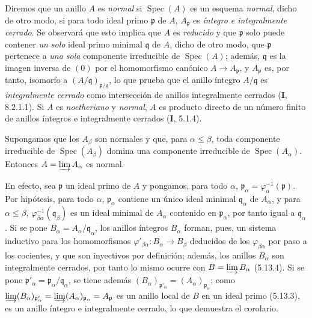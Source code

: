 \begin{env}[5.13.5]
\label{IV.2.s5.13.5-fr}
Diremos que un anillo $A$ es \emph{normal} si
$\operatorname{Spec}(A)$ es un esquema \emph{normal}, dicho de otro modo, si para
todo ideal primo $\mathfrak p$ de $A$, $A_{\mathfrak p}$ es \emph{íntegro e
integralmente cerrado}. Se observará que esto implica que $A$ es \emph{reducido} y que
$\mathfrak p$ solo puede contener \emph{un solo} ideal primo minimal $\mathfrak q$
de $A$, dicho de otro modo, que $\mathfrak p$ pertenece a \emph{una sola} componente
irreducible de $\operatorname{Spec}(A)$; además, $\mathfrak q$ es la imagen
inversa de $(0)$ por el homomorfismo canónico $A\to A_{\mathfrak p}$, y
$A_{\mathfrak p}$ es, por tanto, isomorfo a
$(A/\mathfrak q)_{\mathfrak p/\mathfrak q}$, lo que prueba que el anillo
íntegro $A/\mathfrak q$ es \emph{integralmente cerrado} como intersección de anillos
integralmente cerrados (\textbf I, 8.2.1.1). Si $A$ es \emph{noetheriano} y \emph{normal}, $A$ es
producto directo de un número finito de anillos íntegros e integralmente
cerrados (\textbf{I}, 5.1.4).
\end{env}

\begin{corollary}[5.13.6]
\label{IV.2.s5.13.6-fr}
Supongamos que los $A_\beta$ son normales y que, para
$\alpha\leq\beta$, toda componente irreducible de
$\operatorname{Spec}(A_\beta)$ domina una componente irreducible de
$\operatorname{Spec}(A_\alpha)$. Entonces $A=\varinjlim A_\alpha$ es normal.
\end{corollary}

En efecto, sea $\mathfrak p$ un ideal primo de $A$ y pongamos, para todo
$\alpha$, $\mathfrak p_\alpha=\varphi_\alpha^{-1}(\mathfrak p)$. Por
hipótesis, para todo $\alpha$, $\mathfrak p_\alpha$ contiene un único ideal
minimal $\mathfrak q_\alpha$ de $A_\alpha$, y para $\alpha\leq\beta$,
$\varphi_{\beta\alpha}^{-1}(\mathfrak q_\beta)$ es un ideal minimal de
$A_\alpha$ contenido en $\mathfrak p_\alpha$, por tanto igual a
$\mathfrak q_\alpha$. Si se pone
$B_\alpha=A_\alpha/\mathfrak q_\alpha$, los anillos íntegros $B_\alpha$
forman, pues, un sistema inductivo para los homomorfismos
$\varphi'_{\beta\alpha}:B_\alpha\to B_\beta$ deducidos de los
$\varphi_{\beta\alpha}$ por paso a los cocientes, y que son inyectivos por
definición; además, los anillos $B_\alpha$ son integralmente cerrados, por
tanto lo mismo ocurre con $B=\varinjlim B_\alpha$ (5.13.4). Si se pone
$\mathfrak p'_\alpha=\mathfrak p_\alpha/\mathfrak q_\alpha$, se tiene además
$(B_\alpha)_{\mathfrak p'_\alpha}=(A_\alpha)_{\mathfrak p_\alpha}$; como
$\varinjlim(B_\alpha)_{\mathfrak p'_\alpha}
=\varinjlim(A_\alpha)_{\mathfrak p_\alpha}=A_{\mathfrak p}$
es un anillo local de $B$ en un ideal primo (5.13.3), es un anillo íntegro e
integralmente cerrado, lo que demuestra el corolario.
